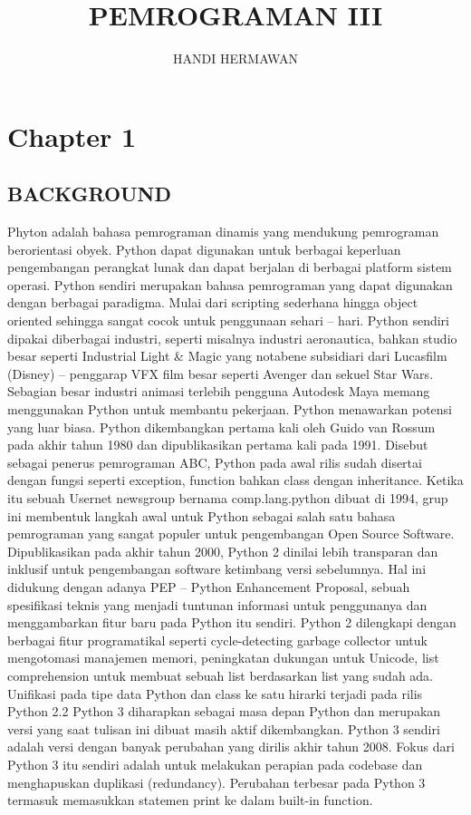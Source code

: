 \documentclass{article}
\title{PEMROGRAMAN III}
\author{HANDI HERMAWAN }
\begin{document}
\maketitle

\section{Chapter 1 }
\subsection{BACKGROUND}
	Phyton adalah bahasa pemrograman dinamis yang mendukung pemrograman berorientasi obyek. Python dapat digunakan untuk berbagai keperluan pengembangan perangkat lunak dan dapat berjalan di berbagai platform sistem operasi. Python sendiri merupakan bahasa pemrograman yang dapat digunakan dengan berbagai paradigma. Mulai dari scripting sederhana hingga object oriented sehingga sangat cocok untuk penggunaan sehari – hari. Python sendiri dipakai diberbagai industri, seperti misalnya industri aeronautica, bahkan studio besar seperti Industrial Light & Magic yang notabene subsidiari dari Lucasfilm (Disney) – penggarap VFX film besar seperti Avenger dan sekuel Star Wars. Sebagian besar industri animasi terlebih pengguna Autodesk Maya memang menggunakan Python untuk membantu pekerjaan. Python menawarkan potensi yang luar biasa. Python dikembangkan pertama kali oleh Guido van Rossum pada akhir tahun 1980 dan dipublikasikan pertama kali pada 1991. Disebut sebagai penerus pemrograman ABC, Python pada awal rilis sudah disertai dengan fungsi seperti exception, function bahkan class dengan inheritance. Ketika itu sebuah Usernet newsgroup bernama comp.lang.python dibuat di 1994, grup ini membentuk langkah awal untuk Python sebagai salah satu bahasa pemrograman yang sangat populer untuk pengembangan Open Source Software.
	Dipublikasikan pada akhir tahun 2000, Python 2 dinilai lebih transparan dan inklusif untuk pengembangan software ketimbang versi sebelumnya. Hal ini didukung dengan adanya PEP – Python Enhancement Proposal, sebuah spesifikasi teknis yang menjadi tuntunan informasi untuk penggunanya dan menggambarkan fitur baru pada Python itu sendiri.
	Python 2 dilengkapi dengan berbagai fitur programatikal seperti cycle-detecting garbage collector untuk mengotomasi manajemen memori, peningkatan dukungan untuk Unicode, list comprehension untuk membuat sebuah list berdasarkan list yang sudah ada. Unifikasi pada tipe data Python dan class ke satu hirarki terjadi pada rilis Python 2.2
	Python 3 diharapkan sebagai masa depan Python dan merupakan versi yang saat tulisan ini dibuat masih aktif dikembangkan. Python 3 sendiri adalah versi dengan banyak perubahan yang dirilis akhir tahun 2008. Fokus dari Python 3 itu sendiri adalah untuk melakukan perapian pada codebase dan menghapuskan duplikasi (redundancy). Perubahan terbesar pada Python 3 termasuk memasukkan statemen print ke dalam built-in function.
\end{document}
